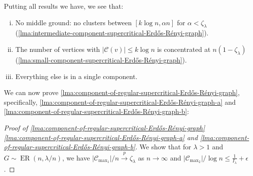 Putting all results we have, we see that:
\begin{enumerate}[(i)]
	\item No middle ground: no clusters between \([k \log n, \alpha n]\) for \(\alpha < \zeta _\lambda \) (\autoref{lma:intermediate-component-supercritical-Erdős-Rényi-graph}).
	\item The number of vertices with \(\lvert \mathcal{C} (v) \rvert \leq k \log n\) is concentrated at \(n (1 - \zeta _\lambda )\) (\autoref{lma:small-component-supercritical-Erdős-Rényi-graph}).
	\item Everything else is in a single component.
\end{enumerate}

We can now prove \autoref{lma:component-of-regular-supercritical-Erdős-Rényi-graph}, specifically, \autoref{lma:component-of-regular-supercritical-Erdős-Rényi-graph-a} and \autoref{lma:component-of-regular-supercritical-Erdős-Rényi-graph-b}:

\begin{proof}[Proof of \autoref{lma:component-of-regular-supercritical-Erdős-Rényi-graph} \autoref{lma:component-of-regular-supercritical-Erdős-Rényi-graph-a} and \autoref{lma:component-of-regular-supercritical-Erdős-Rényi-graph-b}]
	We show that for \(\lambda > 1\) and \(G \sim \operatorname{ER}(n, \lambda / n) \), we have \(\lvert \mathcal{C} _{\max _1} \rvert / n \overset{p}{\to} \zeta _\lambda\) as \(n \to \infty \) and \(\lvert \mathcal{C} _{\max _2} \rvert / \log n \leq \frac{1}{I _\lambda } + \epsilon \).
\end{proof}